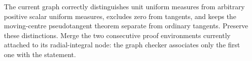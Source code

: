 The current graph correctly distinguishes unit uniform measures from arbitrary
positive scalar uniform measures, excludes zero from tangents, and keeps the
moving-centre pseudotangent theorem separate from ordinary tangents. Preserve
these distinctions. Merge the two consecutive proof environments currently
attached to its radial-integral node: the graph checker associates only the
first one with the statement.
